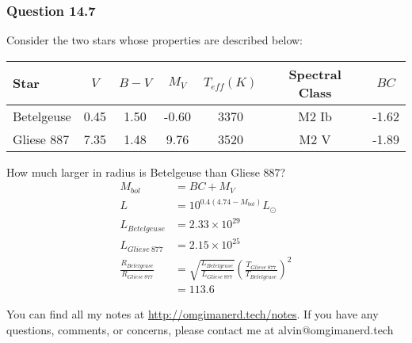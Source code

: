 \documentclass{math}
\begin{document}
\subsubsection*{Question 14.7}
Consider the two stars whose properties are described below:
\begin{center}
  \begin{tabular}{lcccccc}
    Star & \( V \) & \( B-V \) & \( M_V \) & \( T_{eff}(K) \) & Spectral Class
      & \( BC \) \\
    \hline
    Betelgeuse & 0.45 & 1.50 & -0.60 & 3370 & M2 Ib & -1.62 \\
    Gliese 887 & 7.35 & 1.48 & 9.76 & 3520 & M2 V & -1.89
  \end{tabular}
\end{center}
How much larger in radius is Betelgeuse than Gliese 887?
\begin{align*}
  M_{bol} &= BC+M_V \\
  L &= 10^{0.4(4.74-M_{bol})}L_{\odot} \\
  L_{Betelgeuse} &= 2.33\times10^{29} \\
  L_{Gliese~877} &= 2.15\times10^{25} \\
  \frac{R_{Betelgeuse}}{R_{Gliese~877}} &=
    \sqrt{\frac{L_{Betelgeuse}}{L_{Gliese~877}}}
    \left(\frac{T_{Gliese~877}}{T_{Betelgeuse}}\right)^2 \\
  &= 113.6
\end{align*}

\begin{center}
  You can find all my notes at \url{http://omgimanerd.tech/notes}. If you have
  any questions, comments, or concerns, please contact me at
  alvin@omgimanerd.tech
\end{center}
\end{document}
